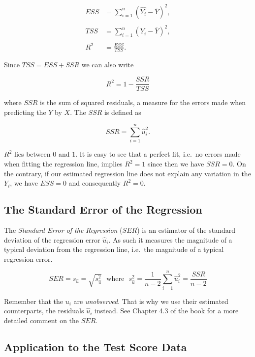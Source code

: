 \documentclass[]{book}
\theoremstyle{definition}
\theoremstyle{definition}
\theoremstyle{definition}
\theoremstyle{remark}
\begin{document}
\begin{align}
  ESS & =  \sum_{i = 1}^n \left( \hat{Y_i} - \overline{Y} \right)^2,   \\
  \\
  TSS & =  \sum_{i = 1}^n \left( Y_i - \overline{Y} \right)^2,   \\
  \\
  R^2 & = \frac{ESS}{TSS}.
\end{align}

Since \(TSS = ESS + SSR\) we can also write

\[ R^2 = 1- \frac{SSR}{TSS} \]

where \(SSR\) is the sum of squared residuals, a measure for the errors
made when predicting the \(Y\) by \(X\). The \(SSR\) is defined as

\[ SSR = \sum_{i=1}^n \hat{u}_i^2. \]

\(R^2\) lies between \(0\) and \(1\). It is easy to see that a perfect
fit, i.e.~no errors made when fitting the regression line, implies
\(R^2 = 1\) since then we have \(SSR=0\). On the contrary, if our
estimated regression line does not explain any variation in the \(Y_i\),
we have \(ESS=0\) and consequently \(R^2=0\).

\subsection*{The Standard Error of the
Regression}\label{the-standard-error-of-the-regression}

The \emph{Standard Error of the Regression} (\(SER\)) is an estimator of
the standard deviation of the regression error \(\hat{u}_i\). As such it
measures the magnitude of a typical deviation from the regression line,
i.e.~the magnitude of a typical regression error.

\[ SER = s_{\hat{u}} = \sqrt{s_{\hat{u}}^2} \ \ \ \text{where} \ \ \ s_{\hat{u} }^2 = \frac{1}{n-2} \sum_{i = 1}^n \hat{u}^2_i = \frac{SSR}{n - 2} \]

Remember that the \(u_i\) are \emph{unobserved}. That is why we use
their estimated counterparts, the residuals \(\hat{u}_i\) instead. See
Chapter 4.3 of the book for a more detailed comment on the \(SER\).

\subsection*{Application to the Test Score
Data}\label{application-to-the-test-score-data}
\end{document}
